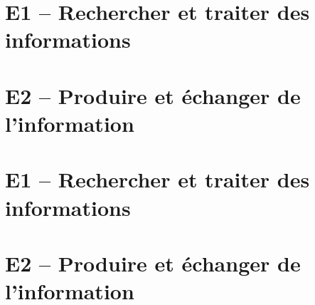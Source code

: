 \proffalse
\section{E1 -- Rechercher et traiter des informations}
\begin{multicols}{2}
\end{multicols}

\section{E2 -- Produire et échanger de l'information}
\begin{multicols}{2}

\end{multicols}


\proftrue
\newpage
\section{E1 -- Rechercher et traiter des informations}
\begin{multicols}{2}
\end{multicols}

\section{E2 -- Produire et échanger de l'information}
\begin{multicols}{2}

\end{multicols}
